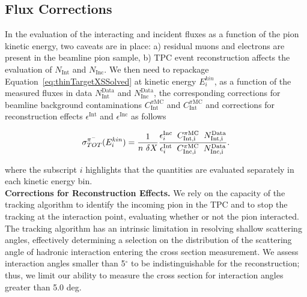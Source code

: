 \documentclass[aps,prl,twocolumn,showpacs,superscriptaddress,groupedaddress]{revtex4}  %
\begin{document}
\subsection{\label{sec:Corrections}Flux Corrections}
In the evaluation of the interacting and incident fluxes as a function of the pion kinetic energy,  two caveats are in place: a) residual muons and electrons are present in the beamline pion sample, b) TPC event reconstruction affects the evaluation of  $N_{\text{Int}}$ and $N_{\text{Inc}}$.
We then need to repackage Equation~\ref{eq:thinTargetXSSolved} at kinetic energy $E^{kin}_i$, as a function of the measured fluxes in data $N^{\text{Data}}_{\text{Int}}$ and $N^{\text{Data}}_{\text{Inc}}$, the corresponding corrections for beamline background contaminations $C^{\pi \text{MC}}_{\text{Int}}$ and $C^{\pi \text{MC}}_{\text{Int}}$ and corrections for reconstruction effects $\epsilon^{\text{Int}}$ and $\epsilon^{\text{Inc}}$ as follows

\begin{equation}
      \sigma^{\pi^-}_{TOT}(E^{kin}_{i})  = \frac{1}{n\text{ } \delta X}\frac{ \epsilon^{\text{Inc}}_i  \hspace{0.2cm} C^{\pi \text{MC}}_{\text{Int,i}}  \hspace{0.2cm} N^{\text{Data}}_{\text{Int,i}}  }{   \epsilon^{\text{Int}}_i \hspace{0.2cm} C^{\pi \text{MC}}_{\text{Inc,i}}  \hspace{0.2cm}  N^{\text{Data}}_{\text{Inc,i}} }.
\label{eq:C}
\end{equation}

where the subscript $i$ highlights that the quantities are evaluated separately in each kinetic energy bin.\\

\textbf{Corrections for Reconstruction Effects.}
We rely on the capacity of the tracking algorithm to identify the incoming pion in the TPC and to stop the tracking at the interaction point, evaluating whether or not the pion interacted.  The tracking algorithm has an intrinsic limitation in resolving shallow scattering angles, effectively determining a selection on the distribution of the scattering angle of hadronic interaction entering the cross section measurement.  We assess interaction angles smaller than 5$^\circ$ to be indistinguishable for the reconstruction; thus, we limit our ability to measure the cross section for interaction angles greater than 5.0 deg. 
\end{document}
